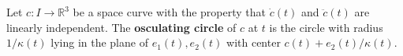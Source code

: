 Let $c: I \to \mathbb{R}^3$ be a space curve with the property that $\dot{c}(t)$ and $\ddot{c}(t)$ are linearly independent. The \textbf{osculating circle} of $c$ at $t$ is the circle with radius $1/\kappa(t)$ lying in the plane of $e_1(t), e_2(t)$ with center $c(t) + e_2(t)/\kappa(t)$.
